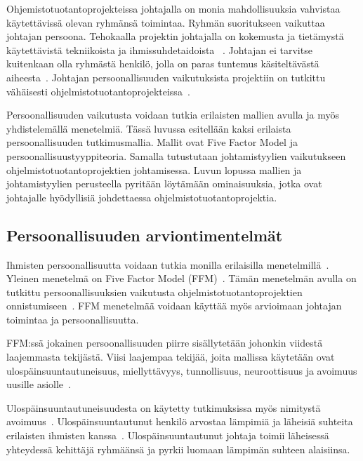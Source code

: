 \documentclass[finnish]{tktltiki2}
\theoremstyle{definition}
\theoremstyle{remark}
\begin{document}
Ohjemistotuotantoprojekteissa johtajalla on monia mahdollisuuksia vahvistaa käytettävissä olevan ryhmänsä toimintaa. Ryhmän suoritukseen vaikuttaa johtajan persoona. Tehokaalla projektin johtajalla on kokemusta ja tietämystä käytettävistä tekniikoista ja ihmissuhdetaidoista ~\cite{McLeod:2011:FAS:1978802.1978803}. Johtajan ei tarvitse kuitenkaan olla ryhmästä henkilö, jolla on paras tuntemus käsiteltävästä aiheesta~\cite{4017705}. Johtajan persoonallisuuden vaikutuksista projektiin on tutkittu vähäisesti ohjelmistotuotantoprojekteissa~\cite{Wang:2009:PMP:1639950.1640049}.

Persoonallisuuden vaikutusta voidaan tutkia erilaisten mallien avulla ja myös yhdistelemällä menetelmiä. Tässä luvussa esitellään kaksi erilaista persoonallisuuden tutkimusmallia. Mallit ovat Five Factor Model ja persoonallisuustyyppiteoria. Samalla tutustutaan johtamistyylien vaikutukseen ohjelmistotuotantoprojektien johtamisessa. Luvun lopussa mallien ja johtamistyylien perusteella pyritään löytämään ominaisuuksia, jotka ovat johtajalle hyödyllisiä johdettaessa ohjelmistotuotantoprojektia.  



\subsection{Persoonallisuuden arviontimentelmät}

Ihmisten persoonallisuutta voidaan tutkia monilla erilaisilla menetelmillä~\cite{digman1990personality}. Yleinen menetelmä on Five Factor Model (FFM)~\cite{digman1990personality, barrick2006big}. Tämän menetelmän avulla on tutkittu persoonallisuuksien vaikutusta ohjelmistotuotantoprojektien onnistumiseen~\cite{Wang:2009:PMP:1639950.1640049}. FFM menetelmää voidaan käyttää myös arvioimaan johtajan toimintaa ja persoonallisuutta.

FFM:ssä jokainen persoonallisuuden piirre sisällytetään johonkin viidestä laajemmasta tekijästä. Viisi laajempaa tekijää, joita mallissa käytetään ovat ulospäinsuuntautuneisuus, miellyttävyys, tunnollisuus, neuroottisuus ja avoimuus uusille asiolle~\cite{barrick2006big, digman1990personality}.

Ulospäinsuuntautuneisuudesta on käytetty tutkimuksissa myös nimitystä avoimuus~\cite{digman1990personality}. Ulospäinsuuntautunut henkilö arvostaa lämpimiä ja läheisiä suhteita erilaisten ihmisten kanssa~\cite{Wang:2009:PMP:1639950.1640049}. Ulospäinsuuntautunut johtaja toimii läheisessä yhteydessä kehittäjä ryhmäänsä ja pyrkii luomaan lämpimän suhteen alaisiinsa.
\end{document}
